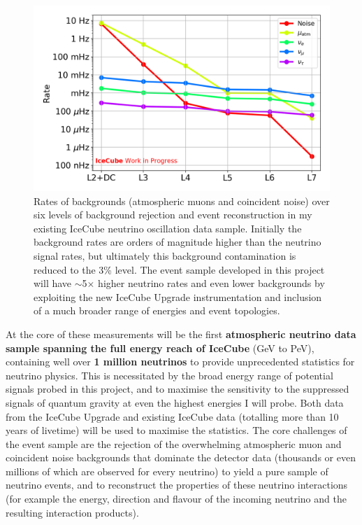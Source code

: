 \documentclass[a4paper,11pt]{article}
\begin{document}
\begin{figure} %
    \centering
    \includegraphics[trim=0.0cm 0.0cm 0.cm 0.0cm, clip=true, width=\linewidth]{images/OscNext_high_stats_event_selection_levels.png}
    \caption{Rates of backgrounds (atmospheric muons and coincident noise) over six levels of background rejection and event reconstruction in my existing IceCube neutrino oscillation data sample. Initially the background rates are orders of magnitude higher than the neutrino signal rates, but ultimately this background contamination is reduced to the 3\% level. The event sample developed in this project will have $\sim$5$\times$ higher neutrino rates and even lower backgrounds by exploiting the new IceCube Upgrade instrumentation and inclusion of a much broader range of energies and event topologies.}
    \label{fig:event_selection}
\end{figure}

At the core of these measurements will be the first \textbf{atmospheric neutrino data sample spanning the full energy reach of IceCube} (GeV to PeV), containing well over \textbf{1 million neutrinos} to provide unprecedented statistics for neutrino physics. This is necessitated by the broad energy range of potential signals probed in this project, and to maximise the sensitivity to the suppressed signals of quantum gravity at even the highest energies I will probe. Both data from the IceCube Upgrade and existing IceCube data (totalling more than 10 years of livetime) will be used to maximise the statistics. The core challenges of the event sample are the rejection of the overwhelming atmospheric muon and coincident noise backgrounds that dominate the detector data (thousands or even millions of which are observed for every neutrino) to yield a pure sample of neutrino events, and to reconstruct the properties of these neutrino interactions (for example the energy, direction and flavour of the incoming neutrino and the resulting interaction products).
\end{document}
